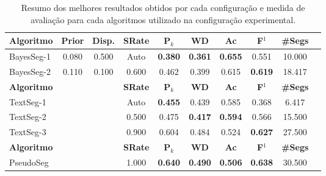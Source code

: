 \begin{table}[!h]
\begin{tabular}{|l||c|c|c|c|c|c|c|c|c|}
\hline
		\textbf{Algoritmo} &
		\textbf{Prior} &
		\textbf{Disp.} & 
		\textbf{SRate}& 
		\textbf{P$_k$} & 
		\textbf{WD} & 
		\textbf{Ac} & 
		\textbf{F$^1$} &
		\textbf{\#Segs} \\	\hline


 BayesSeg-1 & 0.080 & 0.500 &  Auto & \cellcolor{gray!20} \textbf{0.380} & \cellcolor{gray!20} \textbf{0.361} & \cellcolor{gray!20} \textbf{0.655} 
		  & 0.551 & 10.000  \\ \hline 
 BayesSeg-2 & 0.110 & 0.100 & 0.600 & 0.462 & 0.399 & 0.615 
		  & \cellcolor{gray!20} \textbf{0.619} & 18.417  \\ \hline 

\hline
		\textbf{Algoritmo} &&&
		\textbf{SRate} & 
		\textbf{P$_k$} & 
		\textbf{WD} & 
		\textbf{Ac} & 
		\textbf{F$^1$} &
		\textbf{\#Segs} \\	\hline

TextSeg-1 &&& Auto & \cellcolor{gray!20} \textbf{0.455} & 0.439 & 0.585 
		& 0.368 & 6.417  \\ \hline 
TextSeg-2 &&& 0.500 & 0.475 & \cellcolor{gray!20} \textbf{0.417} & \cellcolor{gray!20} \textbf{0.594} 
		& 0.566 & 15.500  \\ \hline 
TextSeg-3 &&& 0.900 & 0.604 & 0.484 & 0.524 
		& \cellcolor{gray!20} \textbf{0.627} & 27.500  \\ \hline 

\hline
		\textbf{Algoritmo} &&&
		\textbf{SRate} & 
		\textbf{P$_k$} & 
		\textbf{WD} & 
		\textbf{Ac} & 
		\textbf{F$^1$} &
		\textbf{\#Segs} \\	\hline


PseudoSeg &&& 1.000& \cellcolor{gray!20} \textbf{0.640} & \cellcolor{gray!20} \textbf{0.490} & \cellcolor{gray!20} \textbf{0.506} 
		   & \cellcolor{gray!20} \textbf{0.638} & 30.500  \\ \hline 



	\end{tabular}
	\caption{Resumo dos melhores resultados obtidos por cada configuração e medida de avaliação para cada algoritmos utilizado na configuração experimental. }
	\label{tab:resumo-resultados}
\end{table}



